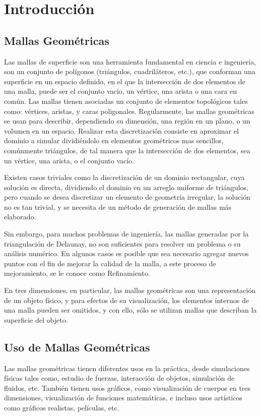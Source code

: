 \chapter{Introducción}
\label{ch:introduction}

\section{Mallas Geométricas}
\label{sec:mallasGeometricas}
Las mallas de superficie son una herramienta fundamental en ciencia e ingeniería, son
un conjunto de polígonos (triángulos, cuadriláteros, etc.), que conforman una superficie en un
espacio definido, en el que la intersección de dos elementos de una malla, puede ser el conjunto
vacío, un vértice, una arista o una cara en común. Las mallas tienen asociadas un conjunto de
elementos topológicos tales como: vértices, aristas, y caras poligonales.
Regularmente, las mallas geométricas se usan para describir, dependiendo su dimensión,
una región en un plano, o un volumen en un espacio. Realizar esta discretización consiste en
aproximar el dominio a simular dividiéndolo en elementos geométricos mas sencillos,
comúnmente triángulos, de tal manera que la intersección de dos elementos, sea un vértice, una
arista, o el conjunto vacío.

Existen casos triviales como la discretización de un dominio rectangular, cuya solución es
directa, dividiendo el dominio en un arreglo uniforme de triángulos, pero cuando se desea
discretizar un elemento de geometría irregular, la solución no es tan trivial, y se necesita de un
método de generación de mallas más elaborado.

Sin embargo, para muchos problemas de ingeniería, las mallas generadas por la
triangulación de Delaunay\cite{Delaunay1934}, no son suficientes para resolver un problema o su análisis numérico. En algunos casos es posible que sea necesario agregar nuevos puntos con el fin de mejorar la
calidad de la malla, a este proceso de mejoramiento, se le conoce como Refinamiento.

En tres dimensiones, en particular, las mallas geométricas son una representación de un
objeto físico, y para efectos de su visualización, los elementos internos de una malla pueden ser
omitidos, y con ello, sólo se utilizan mallas que describan la superficie del objeto.

\section{Uso de Mallas Geométricas}
\label{sec:usosDeLasMallasGeometricas}
Las mallas geométricas tienen diferentes usos en la práctica, desde simulaciones físicas
tales como, estudio de fuerzas, interacción de objetos, simulación de fluidos, etc. También tienen
usos gráficos, como visualización de cuerpos en tres dimensiones, visualización de
funciones matemáticas, e incluso usos artísticos como gráficos realistas, películas, etc.


